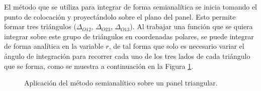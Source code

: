 \documentclass[12pt, oneside, numbers, spanish]{ezthesis}
\numberwithin{equation}{section}
\begin{document}
El método que se utiliza para integrar de forma semianalítica se inicia tomando el punto de colocación y proyectándolo sobre el plano del panel. Esto permite formar tres triángulos ($\Delta_{O12}$, $\Delta_{O23}$, $\Delta_{O13}$). Al trabajar una función que se quiera integrar sobre este grupo de triángulos en coordenadas polares, se puede integrar de forma analítica en la variable $r$, de tal forma que solo es necesario variar el ángulo de integración para recorrer cada uno de los tres lados de cada triángulo que se forma, como se muestra a continuación en la Figura \ref{Fig:Fig_6}.

\begin{figure}[H]
\centering

\caption{Aplicación del método semianalítico sobre un panel triangular.}\label{Fig:Fig_6}
\end{figure}
\end{document}
